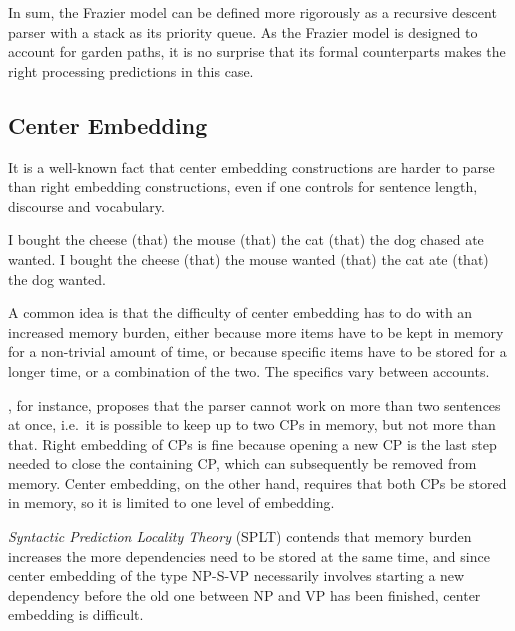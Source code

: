 In sum, the Frazier model can be defined more rigorously as a recursive descent parser with a stack as its priority queue.
As the Frazier model is designed to account for garden paths, it is no surprise that its formal counterparts makes the right processing predictions in this case.

\subsection{Center Embedding}
\label{sub:TopDownEval_CenterEmbedding}
It is a well-known fact that center embedding constructions are harder to parse than right embedding constructions, even if one controls for sentence length, discourse and vocabulary.
%
\begin{exe}
    \ex
    \begin{xlist}
        \ex I bought the cheese (that) the mouse (that) the cat (that) the dog chased ate wanted.
        \ex I bought the cheese (that) the mouse wanted (that) the cat ate (that) the dog wanted.
    \end{xlist}
\end{exe}
%
A common idea is that the difficulty of center embedding has to do with an increased memory burden, either because more items have to be kept in memory for a non-trivial amount of time, or because specific items have to be stored for a longer time, or a combination of the two.
The specifics vary between accounts.

\citet{Kimball73}, for instance, proposes that the parser cannot work on more than two sentences at once, i.e.\ it is possible to keep up to two CPs in memory, but not more than that.
Right embedding of CPs is fine because opening a new CP is the last step needed to close the containing CP, which can subsequently be removed from memory.
Center embedding, on the other hand, requires that both CPs be stored in memory, so it is limited to one level of embedding.

 \emph{Syntactic Prediction Locality Theory} (SPLT) contends that memory burden increases the more dependencies need to be stored at the same time, and since center embedding of the type NP-S-VP necessarily involves starting a new dependency before the old one between NP and VP has been finished, center embedding is difficult.

